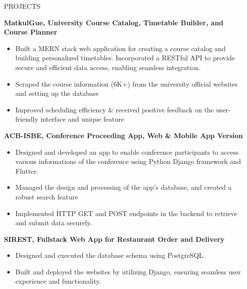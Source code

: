 \documentclass{resume} %
\begin{document}

\begin{rSection}{PROJECTS}

{\bf MatkulGue, University Course Catalog, Timetable Builder, and Course Planner}
\vspace{-0.75em}
\begin{itemize}
\itemsep -7pt {}
\item Built a MERN stack web application for creating a course catalog and building personalized timetables. Incorporated a RESTful API to provide secure and efficient data access, enabling seamless integration.
\item Scraped the course information (6K+) from the university official websites and setting up the database
\item Improved scheduling efficiency \& received positive feedback on the user-friendly interface and unique feature
 \end{itemize}
 \vspace{-0.5em}

{\bf ACB-ISBE, Conference Proceeding App, Web \& Mobile App Version}
\vspace{-0.75em}
\begin{itemize}
\itemsep -7pt {}
\item Designed and developed an app to enable conference participants to access various informations of the conference using Python Django framework and Flutter.
\item Managed the design and processing of the app's database, and created a robust search feature
\item Implemented HTTP GET and POST endpoints in the backend to retrieve and submit data securely.
 \end{itemize}
 \vspace{-0.5em}

{\bf SIREST, Fullstack Web App for Restaurant Order and Delivery}
\vspace{-0.75em}
\begin{itemize}
\itemsep -7pt {}
\item Designed and executed the database schema using PostgreSQL.
\item Built and deployed the websites by utilizing Django, ensuring seamless user experience and functionality.
 \end{itemize}
 \vspace{-0.5em}


\end{rSection}
\end{document}
